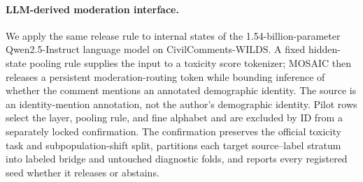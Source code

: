 \paragraph{LLM-derived moderation interface.}
We apply the same release rule to internal states of the 1.54-billion-parameter
Qwen2.5-Instruct language model on CivilComments-WILDS. A fixed hidden-state
pooling rule supplies the input to a toxicity score tokenizer; MOSAIC then
releases a persistent moderation-routing token while bounding inference of
whether the comment mentions an annotated demographic identity. The source is
an identity-mention annotation, not the author's demographic identity. Pilot
rows select the layer, pooling rule, and fine alphabet and are excluded by ID
from a separately locked confirmation. The confirmation preserves the official
toxicity task and subpopulation-shift split, partitions each target
source--label stratum into labeled bridge and untouched diagnostic folds, and
reports every registered seed whether it releases or abstains.


